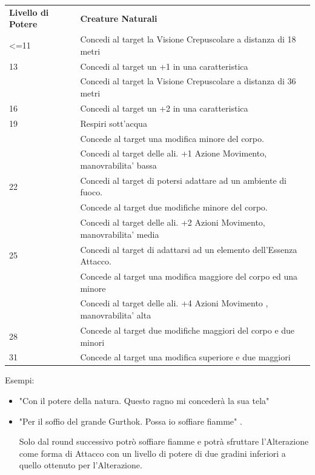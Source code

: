 \documentclass[a4paper,11pt,twoside,openany]{book}
\begin{document}
\begin{tabularx}{0.95\textwidth}{lX}
	\toprule
	\textbf{Livello di Potere} & \textbf{Creature Naturali}\\
	<=11   & Concedi al target la Visione Crepuscolare a distanza di 18 metri\\
	13     & Concedi al target un +1 in una caratteristica\\
	       & Concedi al target la Visione Crepuscolare a distanza di 36 metri\\
	16     & Concedi al target un +2 in una caratteristica\\
	19     & Respiri sott'acqua\\
	       & Concede al target una modifica minore del corpo.\\
	       & Concedi al target delle ali. +1 Azione Movimento, manovrabilita’ bassa\\
	22     & Concedi al target di potersi adattare ad un ambiente di fuoco.\\
	       & Concede al target due modifiche minore del corpo.\\
	       & Concedi al target delle ali. +2 Azioni Movimento, manovrabilita’ media\\
	25     & Concedi al target di adattarsi ad un elemento dell’Essenza Attacco. \\
	       & Concede al target una modifica maggiore del corpo ed una minore\\
	       & Concedi al target delle ali. +4 Azioni Movimento , manovrabilita’ alta\\
	28     & Concede al target due modifiche maggiori del corpo e due minori\\
	31     & Concede al target una modifica superiore e due maggiori\\
\end{tabularx}

\bigskip

Esempi:
\begin{itemize}
	\item
	      "Con il potere della natura. Questo ragno mi concederà la sua tela"
	\item
	      "Per il soffio del grande Gurthok. Possa io soffiare fiamme" .

	      Solo dal round successivo potrò soffiare fiamme e potrà sfruttare l'Alterazione come forma di Attacco con un livello di potere di due gradini inferiori a quello ottenuto per l'Alterazione.
\end{itemize}
\end{document}
